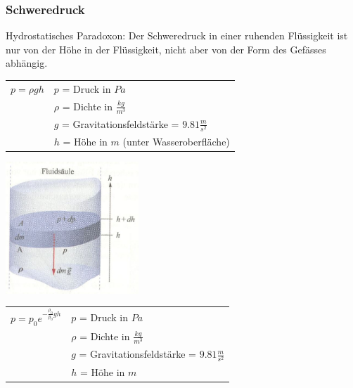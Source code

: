 	\subsubsection{Schweredruck}
		\begin{minipage}[t]{13cm}
				\begin{flushleft}
					Hydrostatisches Paradoxon: Der Schweredruck in einer ruhenden Flüssigkeit ist nur von der Höhe in der Flüssigkeit, nicht aber von der Form des Gefässes abhängig.
				\end{flushleft}
				\renewcommand{\arraystretch}{1.5}
				\begin{tabular}{ p{4cm} | p{7cm}}
					$p = \rho gh$	&	$p$ = Druck in $Pa$\\
					& $\rho$ = Dichte in $\frac{kg}{m^3}$\\
					& $g$ = Gravitationsfeldstärke = $9.81\frac{m}{s^2}$\\
					& $h$ = Höhe in $m$ (unter Wasseroberfläche)\\
				\end{tabular}
				\renewcommand{\arraystretch}{1}
		\end{minipage}
		\begin{minipage}[t]{10cm}
			\vspace{-\ht\strutbox}\includegraphics[width=5cm]{./bilder/Schweredruck.jpg}
		\end{minipage}
		\newline
		\newline
		\newline
		\begin{minipage}[t]{13cm}
			\renewcommand{\arraystretch}{1.5}
			\begin{tabular}{ p{4cm} | p{7cm}}
				$p = p_0 e^{-\frac{\rho_0}{p_0}gh}$	&	$p$ = Druck in $Pa$\\
				& $\rho$ = Dichte in $\frac{kg}{m^3}$\\
				& $g$ = Gravitationsfeldstärke = $9.81\frac{m}{s^2}$\\
				& $h$ = Höhe in $m$\\
			\end{tabular}
			\renewcommand{\arraystretch}{1}
		\end{minipage}
	
